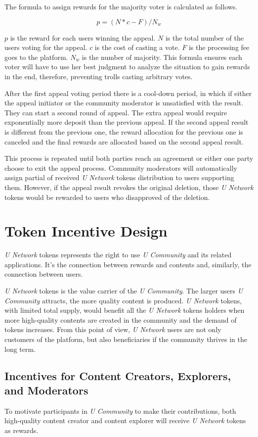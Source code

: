 The formula to assign rewards for the majority voter is calculated as follows. 
\begin{center}
    $${p}=({N}*{c} - {F})/{N_w}$$
\end{center}
$p$ is the reward for each users winning the appeal. $N$ is the total number of the users voting for the appeal. $c$ is the cost of casting a vote. $F$ is the processing fee goes to the platform. $N_w$ is the number of majority. This formula ensures each voter will have to use her best judgment to analyze the situation to gain rewards in the end, therefore, preventing trolls casting arbitrary votes. 


After the first appeal voting period there is a cool-down period, in which if either the appeal initiator or the community moderator is unsatisfied with the result. They can start a second round of appeal. The extra appeal would require exponentially more deposit than the previous appeal. If the second appeal result is different from the previous one, the reward allocation for the previous one is canceled and the final rewards are allocated based on the second appeal result.

This process is repeated until both parties reach an agreement or either one party choose to exit the appeal process. 
Community moderators will automatically assign partial of received \emph{U Network} tokens distribution to users supporting them. However, if the appeal result revokes the original deletion, those \emph{U Network} tokens would be rewarded to users who disapproved of the deletion.  
\section{Token Incentive Design}
\emph{U Network} tokens represents the right to use \emph{U Community} and its related applications. It's the connection between rewards and contents and, similarly, the connection between users.

\emph{U Network} tokens is the value carrier of the \emph{U Community}. The larger users \emph{U Community} attracts, the more quality content is produced. \emph{U Network} tokens, with limited total supply, would benefit all the \emph{U Network} tokens holders when more high-quality contents are created in the community and the demand of tokens increases.  From this point of view, \emph{U Network} users are not only customers of the platform, but also beneficiaries if the community thrives in the long term. 
	
\subsection{Incentives for Content Creators, Explorers, and Moderators} 
To motivate participants in \emph{U Community} to make their contributions, both high-quality content creator and content explorer will receive \emph{U Network} tokens as rewards.


